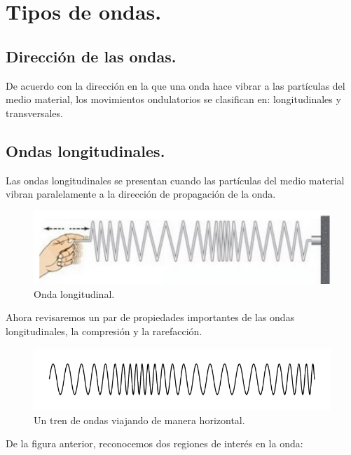 \documentclass[12pt, letter]{article}
\begin{document}
\section{Tipos de ondas.}

\subsection{Dirección de las ondas.}

De acuerdo con la dirección en la que una onda hace vibrar a las partículas del medio material,  los movimientos ondulatorios se clasifican en: longitudinales y transversales.

\subsection{Ondas longitudinales.}

Las ondas longitudinales se presentan cuando las partículas del medio material vibran paralelamente a la dirección de propagación de la onda.
\begin{figure}[H]
    \centering
    \includegraphics[scale=0.35]{Imagenes/Ondas_07.jpg}
    \caption{Onda longitudinal.}
\end{figure}

Ahora revisaremos un par de propiedades importantes de las ondas longitudinales, la compresión y la rarefacción.

\begin{figure}[H]
    \centering
    \includegraphics[scale=0.5]{Imagenes/Reflexion_Ondas_05.png}
    \caption{Un tren de ondas viajando de manera horizontal.}
\end{figure}

De la figura anterior, reconocemos dos regiones de interés en la onda:
\end{document}
